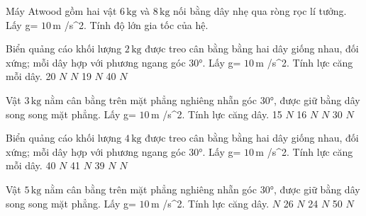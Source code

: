 \begin{bt}
Máy Atwood gồm hai vật $6\,\text{kg}$ và $8\,\text{kg}$ nối bằng dây nhẹ qua ròng rọc lí tưởng. Lấy g= $10\,\text{m}$ /s^2. Tính độ lớn gia tốc của hệ.
\end{bt}

\begin{ex}
Biển quảng cáo khối lượng $2\,\text{kg}$ được treo cân bằng bằng hai dây giống nhau, đối xứng; mỗi dây hợp với phương ngang góc 30°. Lấy g= $10\,\text{m}$ /s^2. Tính lực căng mỗi dây.
\choice
{20 $N$}
{ $N$}
{19 $N$}
{40 $N$}
\end{ex}

\begin{ex}
Vật $3\,\text{kg}$ nằm cân bằng trên mặt phẳng nghiêng nhẵn góc 30°, được giữ bằng dây song song mặt phẳng. Lấy g= $10\,\text{m}$ /s^2. Tính lực căng dây.
\choice
{15 $N$}
{16 $N$}
{ $N$}
{30 $N$}
\end{ex}

\begin{ex}
Biển quảng cáo khối lượng $4\,\text{kg}$ được treo cân bằng bằng hai dây giống nhau, đối xứng; mỗi dây hợp với phương ngang góc 30°. Lấy g= $10\,\text{m}$ /s^2. Tính lực căng mỗi dây.
\choice
{40 $N$}
{41 $N$}
{39 $N$}
{ $N$}
\end{ex}

\begin{ex}
Vật $5\,\text{kg}$ nằm cân bằng trên mặt phẳng nghiêng nhẵn góc 30°, được giữ bằng dây song song mặt phẳng. Lấy g= $10\,\text{m}$ /s^2. Tính lực căng dây.
\choice
{ $N$}
{26 $N$}
{24 $N$}
{50 $N$}
\end{ex}

